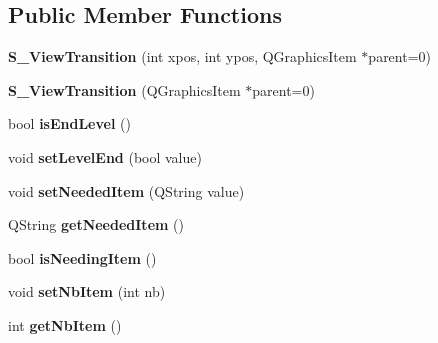 \subsection*{Public Member Functions}
\begin{DoxyCompactItemize}
\item 
\hypertarget{class_s___view_transition_a114168f77853ed98ff87d750f2982b39}{}{\bfseries S\+\_\+\+View\+Transition} (int xpos, int ypos, Q\+Graphics\+Item $\ast$parent=0)\label{class_s___view_transition_a114168f77853ed98ff87d750f2982b39}

\item 
\hypertarget{class_s___view_transition_a95dbe7a7f23bb8ed903ad8dff6f7ea6a}{}{\bfseries S\+\_\+\+View\+Transition} (Q\+Graphics\+Item $\ast$parent=0)\label{class_s___view_transition_a95dbe7a7f23bb8ed903ad8dff6f7ea6a}

\item 
\hypertarget{class_s___view_transition_ab6671a5c3df741a34c2cff8194c8c428}{}bool {\bfseries is\+End\+Level} ()\label{class_s___view_transition_ab6671a5c3df741a34c2cff8194c8c428}

\item 
\hypertarget{class_s___view_transition_afbfd78f5dcb2edb6b5444c4e2a73110a}{}void {\bfseries set\+Level\+End} (bool value)\label{class_s___view_transition_afbfd78f5dcb2edb6b5444c4e2a73110a}

\item 
\hypertarget{class_s___view_transition_af81ef15e45fb55bc71e3e81acb88971a}{}void {\bfseries set\+Needed\+Item} (Q\+String value)\label{class_s___view_transition_af81ef15e45fb55bc71e3e81acb88971a}

\item 
\hypertarget{class_s___view_transition_a9c7c1d53104949673f340c808682806d}{}Q\+String {\bfseries get\+Needed\+Item} ()\label{class_s___view_transition_a9c7c1d53104949673f340c808682806d}

\item 
\hypertarget{class_s___view_transition_a9f623ff7ddaa749fe32af0149e4dc7b7}{}bool {\bfseries is\+Needing\+Item} ()\label{class_s___view_transition_a9f623ff7ddaa749fe32af0149e4dc7b7}

\item 
\hypertarget{class_s___view_transition_a5926082bed3cb63fd6eea5e6d2cfb875}{}void {\bfseries set\+Nb\+Item} (int nb)\label{class_s___view_transition_a5926082bed3cb63fd6eea5e6d2cfb875}

\item 
\hypertarget{class_s___view_transition_aadf7b185d779366bc93d20856e0985c3}{}int {\bfseries get\+Nb\+Item} ()\label{class_s___view_transition_aadf7b185d779366bc93d20856e0985c3}


\end{DoxyCompactItemize}
